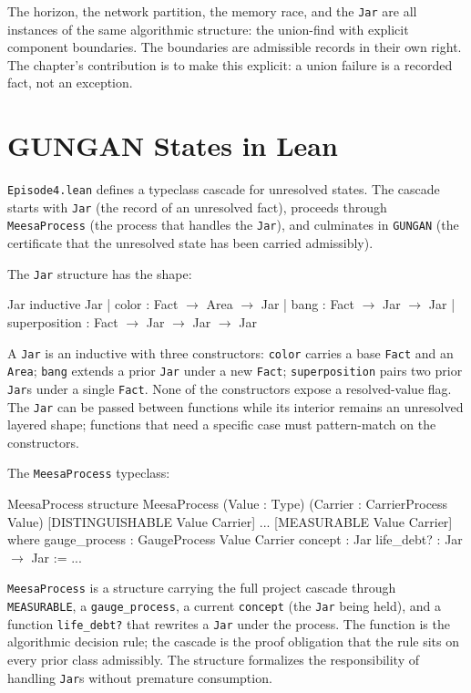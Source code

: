 The horizon, the network partition, the memory race, and the
\texttt{Jar} are all instances of the same algorithmic structure:
the union-find with explicit component boundaries. The boundaries
are admissible records in their own right. The chapter's
contribution is to make this explicit: a union failure is a
recorded fact, not an exception.

\section{GUNGAN States in Lean}
\label{se:gungan-states-in-lean}

\texttt{Episode4.lean} defines a typeclass cascade for unresolved states.
The cascade starts with \texttt{Jar} (the record of an unresolved fact),
proceeds through \texttt{MeesaProcess} (the process that handles the
\texttt{Jar}), and culminates in \texttt{GUNGAN} (the certificate that
the unresolved state has been carried admissibly).

The \texttt{Jar} structure has the shape:

\begin{leanexcerpt}{Jar}
inductive Jar
  | color         : Fact $\to$ Area $\to$ Jar
  | bang          : Fact $\to$ Jar $\to$ Jar
  | superposition : Fact $\to$ Jar $\to$ Jar $\to$ Jar
\end{leanexcerpt}

A \texttt{Jar} is an inductive with three constructors:
\texttt{color} carries a base \texttt{Fact} and an \texttt{Area};
\texttt{bang} extends a prior \texttt{Jar} under a new \texttt{Fact};
\texttt{superposition} pairs two prior \texttt{Jar}s under a single
\texttt{Fact}. None of the constructors expose a resolved-value flag.
The \texttt{Jar} can be passed between functions while its interior
remains an unresolved layered shape; functions that need a specific
case must pattern-match on the constructors.

The \texttt{MeesaProcess} typeclass:

\begin{leanexcerpt}{MeesaProcess}
structure MeesaProcess
    (Value : Type)
    (Carrier : CarrierProcess Value)
    [DISTINGUISHABLE Value Carrier] ... [MEASURABLE Value Carrier]
  where
  gauge_process : GaugeProcess Value Carrier
  concept       : Jar
  life_debt?    : Jar $\to$ Jar := ...
\end{leanexcerpt}

\texttt{MeesaProcess} is a structure carrying the full project cascade
through \texttt{MEASURABLE}, a \texttt{gauge\_process}, a current
\texttt{concept} (the \texttt{Jar} being held), and a function
\texttt{life\_debt?} that rewrites a \texttt{Jar} under the process.
The function is the algorithmic decision rule; the cascade is the
proof obligation that the rule sits on every prior class admissibly.
The structure formalizes the responsibility of handling \texttt{Jar}s
without premature consumption.

